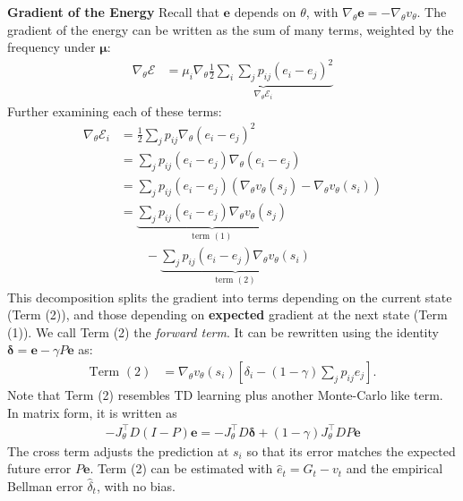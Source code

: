 \documentclass{article}
\theoremstyle{plain}
\theoremstyle{definition}
\theoremstyle{remark}
\begin{document}
\textbf{Gradient of the Energy}
Recall that $\bm{e}$ depends on $\theta$, with $\nabla_\theta \bm{e} = -\nabla_\theta v_\theta$. The gradient of the energy can be written as the sum of many terms, weighted by the frequency under $\bm{\mu}$:
  \begin{align}
  \nabla_\theta \mathcal{E} &=  \mu_i \underbrace{\nabla_\theta \frac{1}{2}\sum_{i} \sum_jp_{ij}
  (e_i - e_j)^2}_{\nabla_\theta \mathcal{E}_i}  \nonumber 
  \end{align}
Further examining each of these terms:
\begin{align}
   \nabla_\theta \mathcal{E}_i  &=  \frac{1}{2} \sum_jp_{ij} \nabla_\theta(e_i - e_j)^2 \\
   &=   \sum_jp_{ij}
  (e_i - e_j)\nabla_\theta(e_i - e_j) \\
    &=    \sum_jp_{ij}
  (e_i - e_j) (\nabla_\theta v_\theta(s_j) -\nabla_\theta v_\theta(s_i)) \\
      &=    \underbrace{\sum_jp_{ij}
  (e_i - e_j) \nabla_\theta v_\theta(s_j)}_{\text{term } (1)} \\ & \qquad - \underbrace{\sum_jp_{ij}
  (e_i - e_j) \nabla_\theta v_\theta(s_i) }_{\text{term } (2)}
\end{align}
This decomposition splits the gradient into terms depending on the current state (Term (2)), and those depending on \textbf{expected} gradient at the next state (Term (1)). We call Term (2) the \textit{forward term}. It can be rewritten using the identity $\bm{\delta} = \bm{e} - \gamma P \bm{e}$ as:
\begin{align}
\text{Term } (2) &= \nabla_\theta v_\theta(s_i) [\delta_i - (1-\gamma) \sum_j p_{ij} e_j].
\end{align}
Note that Term (2) resembles TD learning plus another Monte-Carlo like term. In matrix form, it is written as 
\begin{align}-J_\theta^\intercal D(I-P)\bm{e} = -J_\theta^\intercal D \bm{\delta } + (1-\gamma) J_\theta^\intercal D P \bm{e}\end{align}
The cross term adjusts the prediction at $s_i$ so that its error matches the expected future error $P\bm{e}$. Term (2) can be estimated with $\hat{e}_t = G_t - v_t$ and the empirical Bellman error $\hat{\delta}_t$, with no bias.
\end{document}
